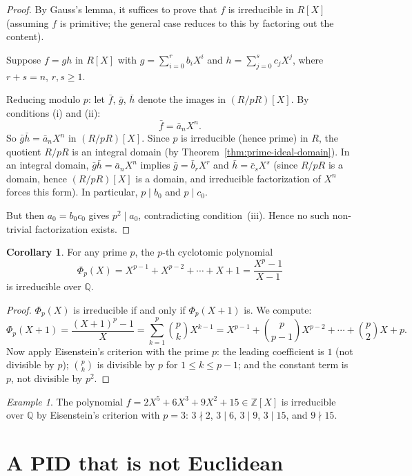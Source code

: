 \documentclass[12pt,a4paper,openany]{book}
\theoremstyle{definition}
\newtheorem{corollary}{Corollary}[chapter]
\theoremstyle{remark}
\newtheorem{example}{Example}[chapter]
\begin{document}
\begin{proof}
By Gauss's lemma, it suffices to prove that $f$ is irreducible in $R[X]$ (assuming $f$ is primitive; the general case reduces to this by factoring out the content).

Suppose $f=gh$ in $R[X]$ with $g=\sum_{i=0}^r b_iX^i$ and $h=\sum_{j=0}^s c_jX^j$, where $r+s=n$, $r,s\geq 1$.

Reducing modulo $p$: let $\bar{f}$, $\bar{g}$, $\bar{h}$ denote the images in $(R/pR)[X]$. By conditions (i) and (ii):
\[
    \bar{f} = \bar{a}_nX^n.
\]
So $\bar{g}\bar{h}=\bar{a}_nX^n$ in $(R/pR)[X]$. Since $p$ is irreducible (hence prime) in $R$, the quotient $R/pR$ is an integral domain (by Theorem~\ref{thm:prime-ideal-domain}). In an integral domain, $\bar{g}\bar{h}=\bar{a}_nX^n$ implies $\bar{g}=\bar{b}_rX^r$ and $\bar{h}=\bar{c}_sX^s$ (since $R/pR$ is a domain, hence $(R/pR)[X]$ is a domain, and irreducible factorization of $X^n$ forces this form). In particular, $p\mid b_0$ and $p\mid c_0$.

But then $a_0=b_0c_0$ gives $p^2\mid a_0$, contradicting condition~(iii). Hence no such non-trivial factorization exists.
\end{proof}

\begin{corollary}\label{cor:eisenstein-cyclotomic}
For any prime $p$, the $p$-th cyclotomic polynomial
\[
    \Phi_p(X)=X^{p-1}+X^{p-2}+\cdots+X+1=\frac{X^p-1}{X-1}
\]
is irreducible over $\mathbb{Q}$.
\end{corollary}

\begin{proof}
$\Phi_p(X)$ is irreducible if and only if $\Phi_p(X+1)$ is. We compute:
\[
    \Phi_p(X+1)=\frac{(X+1)^p-1}{X}=\sum_{k=1}^{p}\binom{p}{k}X^{k-1}=X^{p-1}+\binom{p}{p-1}X^{p-2}+\cdots+\binom{p}{2}X+p.
\]
Now apply Eisenstein's criterion with the prime $p$: the leading coefficient is $1$ (not divisible by $p$); $\binom{p}{k}$ is divisible by $p$ for $1\leq k\leq p-1$; and the constant term is $p$, not divisible by $p^2$.
\end{proof}

\begin{example}\label{ex:eisenstein}
The polynomial $f=2X^5+6X^3+9X^2+15\in\mathbb{Z}[X]$ is irreducible over $\mathbb{Q}$ by Eisenstein's criterion with $p=3$: $3\nmid 2$, $3\mid 6$, $3\mid 9$, $3\mid 15$, and $9\nmid 15$.
\end{example}

\section{A PID that is not Euclidean}\label{sec:PID-not-euclidean}
\end{document}
